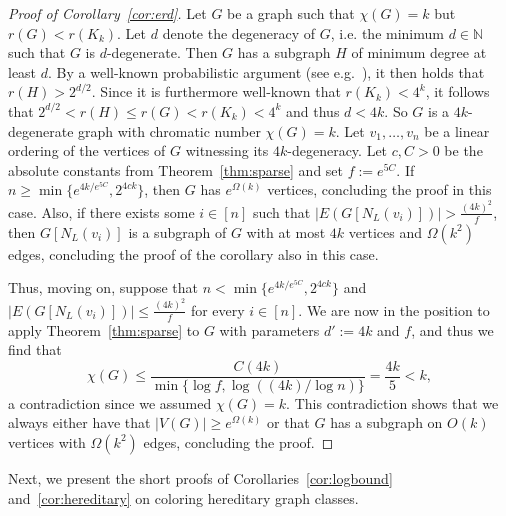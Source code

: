 \documentclass[10pt]{amsart}
\theoremstyle{definition}
\begin{document}
\begin{proof}[Proof of Corollary~\ref{cor:erd}]
Let $G$ be a graph such that $\chi(G)=k$ but $r(G)<r(K_k)$. Let $d$ denote the degeneracy of $G$, i.e. the minimum $d\in \mathbb{N}$ such that $G$ is $d$-degenerate. Then $G$ has a subgraph $H$ of minimum degree at least $d$. By a well-known probabilistic argument (see e.g.~\cite[Proposition~5.4.1.]{yuvalnotes}), it then holds that $r(H)>2^{d/2}$. Since it is furthermore well-known that $r(K_k)<4^k$, it follows that $2^{d/2}<r(H)\le r(G)<r(K_k)<4^k$ and thus $d<4k$. So $G$ is a $4k$-degenerate graph with chromatic number $\chi(G)=k$. Let $v_1,\ldots,v_n$ be a linear ordering of the vertices of $G$ witnessing its $4k$-degeneracy. Let $c,C>0$ be the absolute constants from Theorem~\ref{thm:sparse} and set $f:=e^{5C}$. If $n\ge \min\{e^{4k/e^{5C}},2^{4ck}\}$, then $G$ has $e^{\Omega(k)}$ vertices, concluding the proof in this case. Also, if there exists some $i\in [n]$ such that $|E(G[N_L(v_i)])|>\frac{(4k)^2}{f}$, then $G[N_L(v_i)]$ is a subgraph of $G$ with at most $4k$ vertices and $\Omega(k^2)$ edges, concluding the proof of the corollary also in this case. 

Thus, moving on, suppose that $n< \min\{e^{4k/e^{5C}},2^{4ck}\}$ and $|E(G[N_L(v_i)])| \leq \frac{(4k)^2}{f}$ for every $i\in [n]$. We are now in the position to apply Theorem~\ref{thm:sparse} to $G$ with parameters $d':=4k$ and $f$, and thus we find that
$$\chi(G)\le \frac{C(4k)}{\min\{\log f, \log((4k)/\log n)\}}=\frac{4k}{5}<k,$$ a contradiction since we assumed $\chi(G)=k$. This contradiction shows that we always either have that $|V(G)|\ge e^{\Omega(k)}$ or that $G$ has a subgraph on $O(k)$ vertices with $\Omega(k^2)$ edges, concluding the proof.
\end{proof}
Next, we present the short proofs of Corollaries~\ref{cor:logbound} and~\ref{cor:hereditary} on coloring hereditary graph classes.
\end{document}
